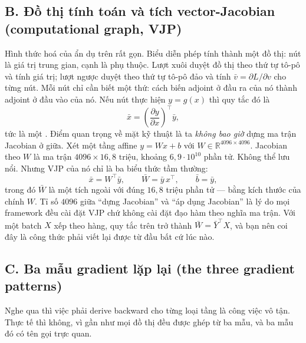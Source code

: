 \documentclass[../../../deep_learning.tex]{subfiles}
\begin{document}
\subsection{B. Đồ thị tính toán và tích vector-Jacobian (computational graph, VJP)}
Hình thức hoá của ẩn dụ trên rất gọn. Biểu diễn phép tính thành một đồ thị: nút là giá trị trung gian, cạnh là phụ thuộc. Lượt xuôi duyệt đồ thị theo thứ tự tô-pô và tính giá trị; lượt ngược duyệt theo thứ tự tô-pô đảo và tính  \(\bar v = \partial L/\partial v\) cho từng nút. Mỗi nút chỉ cần biết một thứ: cách biến adjoint ở đầu ra của nó thành adjoint ở đầu vào của nó. Nếu nút thực hiện \(y = g(x)\) thì quy tắc đó là
\[
\bar x = \left(\frac{\partial y}{\partial x}\right)^{\!\top}\bar y ,
\]
tức là một . Điểm quan trọng về mặt kỹ thuật là ta \emph{không bao giờ} dựng ma trận Jacobian ở giữa. Xét một tầng affine \(y = Wx + b\) với \(W \in \mathbb{R}^{4096\times 4096}\). Jacobian theo \(W\) là ma trận \(4096 \times 16{,}8\text{ triệu}\), khoảng \(6{,}9\cdot 10^{10}\) phần tử. Không thể lưu nổi. Nhưng VJP của nó chỉ là ba biểu thức tầm thường:
\[
\bar x = W^\top \bar y, \qquad \bar W = \bar y\, x^\top, \qquad \bar b = \bar y ,
\]
trong đó \(\bar W\) là một tích ngoài với đúng \(16{,}8\) triệu phần tử --- bằng kích thước của chính \(W\). Tỉ số \(4096\) giữa ``dựng Jacobian'' và ``áp dụng Jacobian'' là lý do mọi framework  đều cài đặt VJP chứ không cài đặt đạo hàm theo nghĩa ma trận. Với một batch \(X\) xếp theo hàng, quy tắc trên trở thành \(\bar W = \bar Y^\top X\), và bạn nên coi đây là công thức phải viết lại được từ đầu bất cứ lúc nào.

\subsection{C. Ba mẫu gradient lặp lại (the three gradient patterns)}
Nghe qua thì việc phải derive backward cho từng loại tầng là công việc vô tận. Thực tế thì không, vì gần như mọi đồ thị đều được ghép từ ba mẫu, và ba mẫu đó có tên gọi trực quan.
\end{document}
